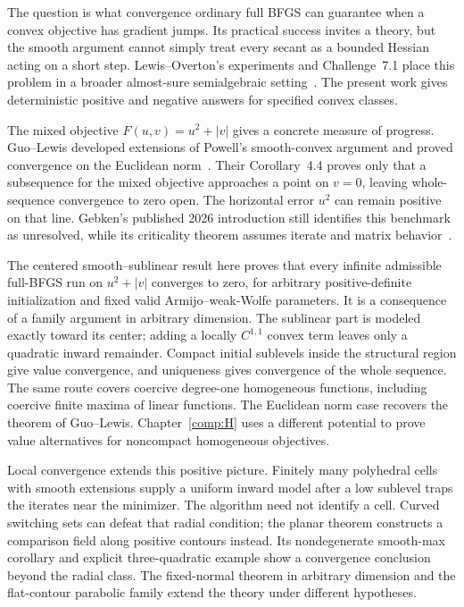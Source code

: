 The question is what convergence ordinary full BFGS can guarantee when a
convex objective has gradient jumps. Its practical success invites a
theory, but the smooth argument cannot simply treat every secant as a
bounded Hessian acting on a short step. Lewis--Overton's experiments and
Challenge~7.1 place this problem in a broader almost-sure semialgebraic
setting~\cite{LO}. The present work gives deterministic positive and negative
answers for specified convex classes.

The mixed objective $F(u,v)=u^2+|v|$ gives a concrete measure of progress.
Guo--Lewis developed extensions of Powell's smooth-convex argument and
proved convergence on the Euclidean norm~\cite[Theorems~3.2, 4.1, 4.3 and
Corollary~4.2]{GL18}. Their Corollary~4.4 proves only that a subsequence for
the mixed objective approaches a point on $v=0$, leaving whole-sequence
convergence to zero open. The horizontal error $u^2$ can remain positive on
that line. Gebken's published 2026 introduction still identifies this
benchmark as unresolved, while its criticality theorem assumes iterate
and matrix behavior~\cite[Theorem~3.1 and (B1)]{BG}.

The centered smooth--sublinear result here proves that every infinite
admissible full-BFGS run on $u^2+|v|$ converges to zero, for arbitrary
positive-definite initialization and fixed valid Armijo--weak-Wolfe
parameters. It is a consequence of a family argument in arbitrary dimension.
The sublinear part is modeled exactly toward its center; adding a locally
$C^{1,1}$ convex term leaves only a quadratic inward remainder. Compact
initial sublevels inside the structural region give value convergence,
and uniqueness gives convergence of the whole sequence. The same route
covers coercive degree-one homogeneous functions, including coercive finite
maxima of linear functions. The Euclidean norm case recovers the theorem of
Guo--Lewis.
Chapter~\ref{comp:H} uses a different potential to prove value alternatives
for noncompact homogeneous objectives.

Local convergence extends this positive picture. Finitely many polyhedral
cells with smooth extensions supply a uniform inward model after a low
sublevel traps the iterates near the minimizer. The algorithm need not
identify a cell. Curved switching sets can defeat that radial condition;
the planar theorem constructs a comparison field along positive contours
instead. Its nondegenerate smooth-max corollary and explicit three-quadratic
example show a convergence conclusion beyond the radial class. The
fixed-normal theorem in arbitrary dimension and the flat-contour parabolic
family extend the theory under different hypotheses.

